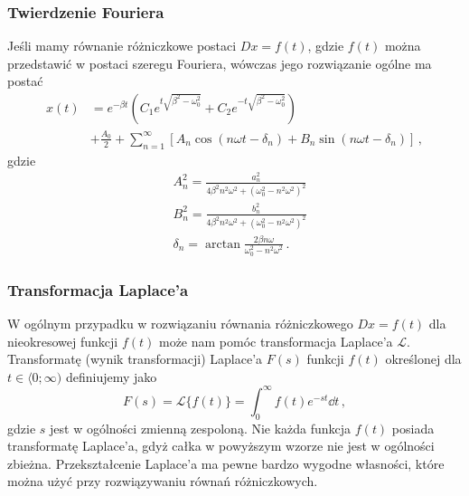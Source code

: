 \documentclass[../main.tex]{subfiles}
\begin{document}
\subsubsection{Twierdzenie Fouriera}
\noindent{}
\medskip

Jeśli mamy równanie różniczkowe postaci \(Dx=f(t)\), gdzie \(f(t)\) można przedstawić w postaci
szeregu Fouriera, wówczas jego rozwiązanie ogólne ma postać
\begin{equation*}
\begin{split}
    x(t)&=e^{-\beta t}\left(C_1e^{t\sqrt{\beta^2-\omega_0^2}}+C_2e^{-t\sqrt{\beta^2-\omega_0^2}}\right)\\
    &+\frac{A_0}{2}+\sum_{n=1}^\infty \left[A_n\cos (n\omega t-\delta_n)+B_n\sin (n\omega t-\delta_n)\right]\,,
\end{split}
\end{equation*}
gdzie
\begin{equation*}
\begin{split}
    &A_n^2=\frac{a_n^2}{4\beta^2n^2\omega^2+(\omega_0^2-n^2\omega^2)^2}\\
    &B_n^2=\frac{b_n^2}{4\beta^2n^2\omega^2+(\omega_0^2-n^2\omega^2)^2}\\
    &\delta_n=\arctan\frac{2\beta n\omega}{\omega_0^2-n^2\omega^2}\,.
\end{split}
\end{equation*}
\subsubsection{Transformacja Laplace'a}
W ogólnym przypadku w rozwiązaniu równania różniczkowego \(Dx=f(t)\) dla nieokresowej funkcji
\(f(t)\) może nam pomóc transformacja Laplace'a \(\mathscr{L}\). Transformatę (wynik transformacji)
Laplace'a \(F(s)\) funkcji \(f(t)\) określonej dla \(t\in\langle 0;\infty)\) definiujemy jako
\begin{equation*}
    F(s)=\mathscr{L}\{f(t)\}=\int_0^\infty f(t)e^{-st}\dd{t}\,,
\end{equation*}
gdzie \(s\) jest w ogólności zmienną zespoloną. Nie każda funkcja \(f(t)\) posiada transformatę
Laplace'a, gdyż całka w powyższym wzorze nie jest w ogólności zbieżna. Przekształcenie Laplace'a ma
pewne bardzo wygodne własności, które można użyć przy rozwiązywaniu równań różniczkowych.
\end{document}
